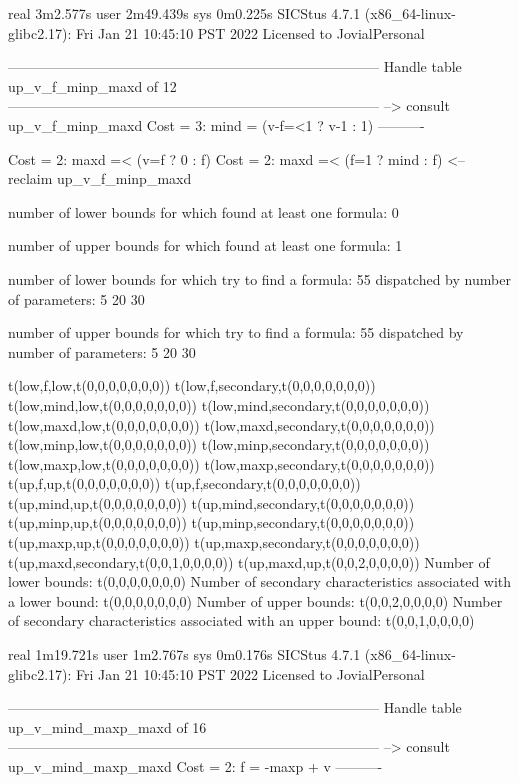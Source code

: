 real	3m2.577s
user	2m49.439s
sys	0m0.225s
SICStus 4.7.1 (x86_64-linux-glibc2.17): Fri Jan 21 10:45:10 PST 2022
Licensed to JovialPersonal


--------------------------------------------------------------------------------
Handle table up_v_f_minp_maxd of 12
--------------------------------------------------------------------------------
--> consult up_v_f_minp_maxd
Cost =  3:  mind = (v-f=<1 ? v-1 : 1)
----------

Cost =  2:  maxd =< (v=f ? 0 : f)
Cost =  2:  maxd =< (f=1 ? mind : f)
<-- reclaim up_v_f_minp_maxd

number of lower bounds for which found at least one formula: 0

number of upper bounds for which found at least one formula: 1

number of lower bounds for which try to find a formula: 55
dispatched by number of parameters: 5  20  30

number of upper bounds for which try to find a formula: 55
dispatched by number of parameters: 5  20  30

t(low,f,low,t(0,0,0,0,0,0,0))
t(low,f,secondary,t(0,0,0,0,0,0,0))
t(low,mind,low,t(0,0,0,0,0,0,0))
t(low,mind,secondary,t(0,0,0,0,0,0,0))
t(low,maxd,low,t(0,0,0,0,0,0,0))
t(low,maxd,secondary,t(0,0,0,0,0,0,0))
t(low,minp,low,t(0,0,0,0,0,0,0))
t(low,minp,secondary,t(0,0,0,0,0,0,0))
t(low,maxp,low,t(0,0,0,0,0,0,0))
t(low,maxp,secondary,t(0,0,0,0,0,0,0))
t(up,f,up,t(0,0,0,0,0,0,0))
t(up,f,secondary,t(0,0,0,0,0,0,0))
t(up,mind,up,t(0,0,0,0,0,0,0))
t(up,mind,secondary,t(0,0,0,0,0,0,0))
t(up,minp,up,t(0,0,0,0,0,0,0))
t(up,minp,secondary,t(0,0,0,0,0,0,0))
t(up,maxp,up,t(0,0,0,0,0,0,0))
t(up,maxp,secondary,t(0,0,0,0,0,0,0))
t(up,maxd,secondary,t(0,0,1,0,0,0,0))
t(up,maxd,up,t(0,0,2,0,0,0,0))
Number of lower bounds:                                             t(0,0,0,0,0,0,0)
Number of secondary characteristics associated with a lower bound:  t(0,0,0,0,0,0,0)
Number of upper bounds:                                             t(0,0,2,0,0,0,0)
Number of secondary characteristics associated with an upper bound: t(0,0,1,0,0,0,0)

real	1m19.721s
user	1m2.767s
sys	0m0.176s
SICStus 4.7.1 (x86_64-linux-glibc2.17): Fri Jan 21 10:45:10 PST 2022
Licensed to JovialPersonal


--------------------------------------------------------------------------------
Handle table up_v_mind_maxp_maxd of 16
--------------------------------------------------------------------------------
--> consult up_v_mind_maxp_maxd
Cost =  2:  f = -maxp + v
----------

